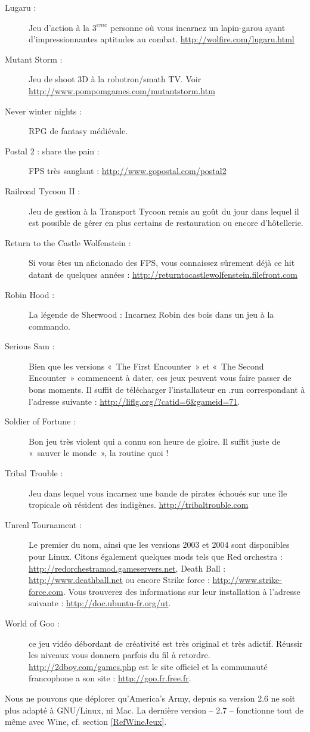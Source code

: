 \begin{description}
\item[Lugaru :] Jeu d'action à la $3^{eme}$ personne où vous incarnez un lapin-garou ayant d'impressionnantes aptitudes au combat. \url{http://wolfire.com/lugaru.html}
\item[Mutant Storm :] Jeu de shoot 3D à la robotron/smath TV. Voir \url{http://www.pompomgames.com/mutantstorm.htm}
\item[Never winter nights :] RPG de fantasy médiévale.
\item[Postal 2 : share the pain :] FPS très sanglant : \url{http://www.gopostal.com/postal2}
\item[Railroad Tycoon II :] Jeu de gestion à la Transport Tycoon remis au goût du jour dans lequel il est possible de gérer en plus certains  de restauration ou encore d'hôtellerie.
\item[Return to the Castle Wolfenstein :] Si vous êtes un aficionado des FPS, vous connaissez sûrement déjà ce hit datant de quelques années : \url{http://returntocastlewolfenstein.filefront.com}
\item[Robin Hood :] La légende de Sherwood : Incarnez Robin des bois dans un jeu à la commando.
\item[Serious Sam :] Bien que les versions «~The First Encounter~» et «~The Second Encounter~» commencent à dater, ces jeux peuvent vous faire passer de bons moments. Il suffit de télécharger l'installateur en .run correspondant à l'adresse suivante : \url{http://liflg.org/?catid=6&gameid=71}.
\item[Soldier of Fortune :] Bon jeu très violent qui a connu son heure de gloire. Il suffit juste de «~sauver le monde~», la routine quoi ! 
\item[Tribal Trouble :] Jeu dans lequel vous incarnez une bande de pirates échoués sur une île tropicale où résident des indigènes. \url{http://tribaltrouble.com}
\item[Unreal Tournament :] Le premier du nom, ainsi que les versions 2003 et 2004 sont disponibles pour Linux. Citons également quelques mods tels que Red orchestra : \url{http://redorchestramod.gameservers.net}, Death Ball : \url{http://www.deathball.net} ou encore Strike force : \url{http://www.strike-force.com}. Vous trouverez des informations sur leur installation à l'adresse suivante : \url{http://doc.ubuntu-fr.org/ut}.
\item[World of Goo :] ce jeu vidéo débordant de créativité est très original et très adictif. Réussir les niveaux vous donnera parfois du fil à retordre. \url{http://2dboy.com/games.php} est le site officiel et la communauté francophone a son site : \url{http://goo.fr.free.fr}.
\end{description}
\begin{nota}
Nous ne pouvons que déplorer qu'America's Army, depuis sa version 2.6 ne soit plus adapté à GNU/Linux, ni Mac. La dernière version -- 2.7 -- fonctionne tout de même avec Wine, cf. section \ref{RefWineJeux}.
\end{nota}
